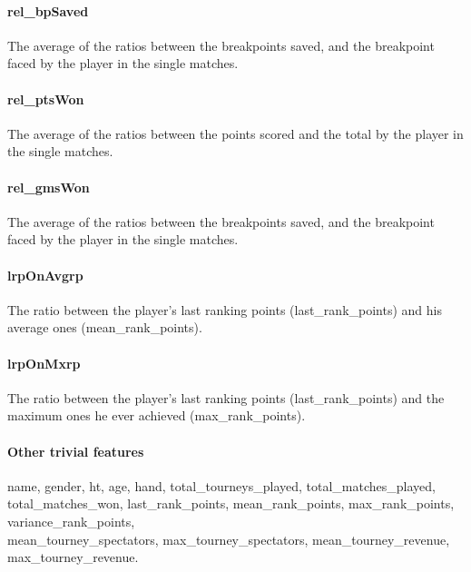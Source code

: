 \documentclass{article}
\begin{document}
\paragraph{rel\_bpSaved}
The average of the ratios between the breakpoints saved, and the breakpoint faced by the player in the single matches.

\paragraph{rel\_ptsWon}
The average of the ratios between the points scored and the total by the player in the single matches.

\paragraph{rel\_gmsWon}
The average of the ratios between the breakpoints saved, and the breakpoint faced by the player in the single matches.

\paragraph{lrpOnAvgrp}
The ratio between the player's last ranking points (last\_rank\_points) and his average ones (mean\_rank\_points).

\paragraph{lrpOnMxrp}
The ratio between the player's last ranking points (last\_rank\_points) and the maximum ones he ever achieved (max\_rank\_points).


\paragraph{Other trivial features}
name, gender, ht, age, hand, total\_tourneys\_played, total\_matches\_played,\\ total\_matches\_won, last\_rank\_points, mean\_rank\_points, max\_rank\_points, variance\_rank\_points, \\ mean\_tourney\_spectators, max\_tourney\_spectators, mean\_tourney\_revenue, max\_tourney\_revenue.    
\end{document}
